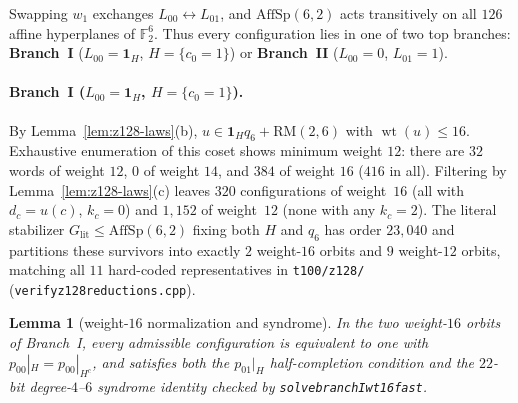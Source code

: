 \documentclass[11pt]{article}
\newtheorem{lemma}[theorem]{Lemma}
\theoremstyle{definition}
\theoremstyle{remark}
\newcommand{\F}{\mathbb{F}}
\newcommand{\wt}{\operatorname{wt}}
\newcommand{\ind}{\mathbf{1}}
\newcommand{\RM}{\mathrm{RM}}
\newcommand{\code}[1]{\texttt{#1}}
\DeclareRobustCommand{\_}{\textunderscore\allowbreak}
\begin{document}
Swapping $w_1$ exchanges $L_{00}\leftrightarrow L_{01}$, and $\mathrm{AffSp}(6,2)$ acts transitively on all $126$ affine hyperplanes of $\F_2^6$. Thus every configuration lies in one of two top branches: \textbf{Branch~I} ($L_{00}=\ind_H$, $H=\{c_0=1\}$) or \textbf{Branch~II} ($L_{00}=0$, $L_{01}=1$).

\paragraph{Branch~I ($L_{00}=\ind_H$, $H=\{c_0=1\}$).}
By Lemma~\ref{lem:z128-laws}(b), $u\in\ind_Hq_6+\RM(2,6)$ with $\wt(u)\le16$. Exhaustive enumeration of this coset shows minimum weight $12$: there are $32$ words of weight $12$, $0$ of weight $14$, and $384$ of weight $16$ ($416$ in all). Filtering by Lemma~\ref{lem:z128-laws}(c) leaves $320$ configurations of weight~$16$ (all with $d_c=u(c)$, $k_c=0$) and $1{,}152$ of weight~$12$ (none with any $k_c=2$). The literal stabilizer $G_{\mathrm{lit}}\le\mathrm{AffSp}(6,2)$ fixing both $H$ and $q_6$ has order $23{,}040$ and partitions these survivors into exactly $2$ weight-$16$ orbits and $9$ weight-$12$ orbits, matching all $11$ hard-coded representatives in \code{t100/z128/} (\code{verify\_z128\_reductions.cpp}).

\begin{lemma}[weight-$16$ normalization and syndrome]\label{lem:wt16}
In the two weight-$16$ orbits of Branch~I, every admissible configuration is equivalent to one with $p_{00}|_H=p_{00}|_{H^c}$, and satisfies both the $p_{01}|_H$ half-completion condition and the $22$-bit degree-$4$--$6$ syndrome identity checked by \code{solve\_branchI\_wt16\_fast}.
\end{lemma}
\end{document}
